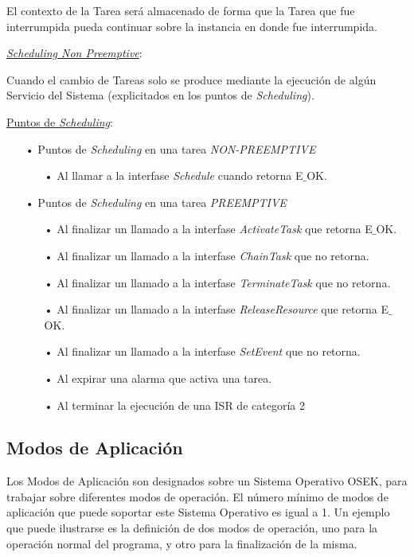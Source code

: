 \documentclass[12pt,letterpaper]{article}
\begin{document}
El contexto de la Tarea será almacenado de forma que la Tarea que fue interrumpida pueda continuar sobre la instancia en donde fue interrumpida.

\underline{\textit{Scheduling Non Preemptive}}:

Cuando el cambio de Tareas solo se produce mediante la ejecución de algún Servicio del Sistema (explicitados en los puntos de \textit{Scheduling}).


\underline{Puntos de \textit{Scheduling}}:

\begin{enumerate}
\item[•]Puntos de \textit{Scheduling} en una tarea \textit{NON-PREEMPTIVE}
\begin{enumerate}
\item[•]Al llamar a la interfase \textit{Schedule} cuando retorna E$\_$OK.
\end{enumerate}
\item[•]Puntos de \textit{Scheduling} en una tarea \textit{PREEMPTIVE}
\begin{enumerate}
\item[•]Al finalizar un llamado a la interfase \textit{ActivateTask} que retorna E$\_$OK.
\item[•]Al finalizar un llamado a la interfase \textit{ChainTask} que no retorna.
\item[•]Al finalizar un llamado a la interfase \textit{TerminateTask} que no retorna.
\item[•]Al finalizar un llamado a la interfase \textit{ReleaseResource} que retorna E$\_$OK.
\item[•]Al finalizar un llamado a la interfase \textit{SetEvent} que no retorna.
\item[•]Al expirar una alarma que activa una tarea.
\item[•]Al terminar la ejecución de una ISR de categoría 2
\end{enumerate}
\end{enumerate} 

\subsection{Modos de Aplicación}
Los Modos de Aplicación son designados sobre un Sistema Operativo OSEK, para trabajar sobre diferentes modos de operación. El número mínimo de modos de aplicación que puede soportar este Sistema Operativo es igual a 1. Un ejemplo que puede ilustrarse es la definición de dos modos de operación, uno para la operación normal del programa, y otro para la finalización de la misma.
\end{document}
